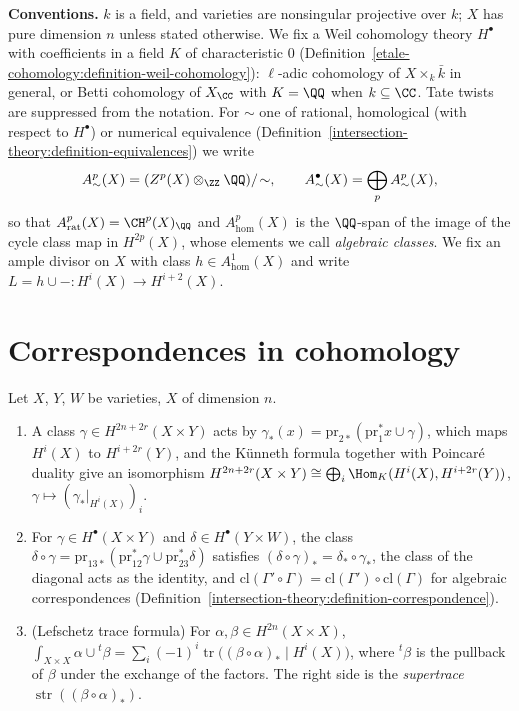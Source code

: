 \noindent\textbf{Conventions.} $k$ is a field, and varieties are nonsingular projective over $k$; $X$ has pure dimension $n$ unless stated otherwise. We fix a Weil cohomology theory $H^\bullet$ with
coefficients in a field $K$ of characteristic $0$ (Definition~\ref{etale-cohomology:definition-weil-cohomology}): $\ell$-adic cohomology of $X \times_k\bar k$ in general, or Betti cohomology of $X_\CC$ with
$K = \QQ$ when $k \subseteq \CC$. Tate twists are suppressed from the notation. For $\sim$ one of rational, homological (with respect to $H^\bullet$) or numerical equivalence
(Definition~\ref{intersection-theory:definition-equivalences}) we write
\[
A^p_\sim(X) = (Z^p(X) \otimes_\ZZ\QQ)/\!\sim, \qquad A^\bullet_\sim(X) = \bigoplus_pA^p_\sim(X),
\]
so that $A^p_{\mathrm{rat}}(X) = \CH^p(X)_\QQ$ and $A^p_{\mathrm{hom}}(X)$ is the $\QQ$-span of the image of the cycle class map in $H^{2p}(X)$, whose elements we call \emph{algebraic classes}. We fix an ample divisor on
$X$ with class $h \in A^1_{\mathrm{hom}}(X)$ and write $L = h \cup - \colon H^i(X) \to H^{i+2}(X)$.

\section{Correspondences in cohomology}\label{absolute-hodge:section-correspondences}

\begin{proposition}\label{absolute-hodge:proposition-cohomological-correspondences}
Let $X$, $Y$, $W$ be varieties, $X$ of dimension $n$.
\begin{enumerate}
\item A class $\gamma \in H^{2n+2r}(X \times Y)$ acts by $\gamma_*(x) = \mathrm{pr}_{2*}(\mathrm{pr}_1^*x \cup \gamma)$, which maps $H^i(X)$ to $H^{i+2r}(Y)$, and the K\"unneth formula together with Poincar\'e duality
give an isomorphism $H^{2n+2r}(X \times Y) \cong \bigoplus_i\Hom_K(H^i(X), H^{i+2r}(Y))$, $\gamma \mapsto (\gamma_*|_{H^i(X)})_i$.
\item For $\gamma \in H^\bullet(X \times Y)$ and $\delta \in H^\bullet(Y \times W)$, the class $\delta \circ \gamma = \mathrm{pr}_{13*}(\mathrm{pr}_{12}^*\gamma \cup \mathrm{pr}_{23}^*\delta)$ satisfies
$(\delta \circ \gamma)_* = \delta_* \circ \gamma_*$, the class of the diagonal acts as the identity, and $\mathrm{cl}(\Gamma' \circ \Gamma) = \mathrm{cl}(\Gamma') \circ \mathrm{cl}(\Gamma)$ for algebraic correspondences
(Definition~\ref{intersection-theory:definition-correspondence}).
\item (Lefschetz trace formula) For $\alpha, \beta \in H^{2n}(X \times X)$, $\int_{X \times X}\alpha \cup {}^t\beta = \sum_i(-1)^i\operatorname{tr}\big((\beta \circ \alpha)_* \mid H^i(X)\big)$, where ${}^t\beta$ is the pullback of
$\beta$ under the exchange of the factors. The right side is the \emph{supertrace} $\operatorname{str}((\beta \circ \alpha)_*)$.
\end{enumerate}
\end{proposition}

